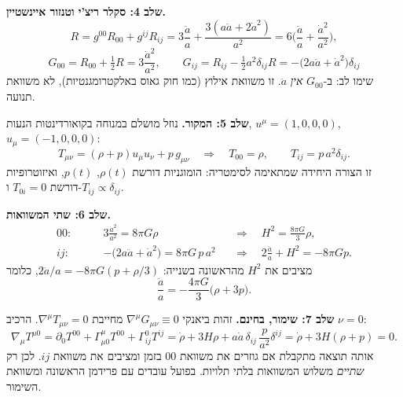 \textbf{שלב 4: סקלר ריצ'י וטנזור איינשטיין.}
\begin{equation}
R=g^{00}R_{00}+g^{ij}R_{ij}=3\frac{\ddot a}{a}+\frac{3(a\ddot a+2\dot a^2)}{a^2}=6\Big(\frac{\ddot a}{a}+\frac{\dot a^2}{a^2}\Big),
\end{equation}
\begin{equation}
\boxed{\;G_{00}=R_{00}+\tfrac12R=3\frac{\dot a^2}{a^2},\qquad
G_{ij}=R_{ij}-\tfrac12a^2\delta_{ij}R=-\big(2a\ddot a+\dot a^2\big)\delta_{ij}\;}
\end{equation}
שימו לב: ב-$G_{00}$ \emph{אין} $\ddot a$. זו משוואת אילוץ (כמו חוק גאוס באלקטרומגנטיות), לא משוואת תנועה.

\textbf{שלב 5: המקור.} נוזל מושלם במנוחה בקואורדינטות הנעות, $u^\mu=(1,0,0,0)$, $u_\mu=(-1,0,0,0)$:
\begin{equation}
T_{\mu\nu}=(\rho+p)u_\mu u_\nu+p\,g_{\mu\nu}\quad\Longrightarrow\quad T_{00}=\rho,\qquad T_{ij}=p\,a^2\delta_{ij}.
\end{equation}
זו הצורה היחידה שמתאימה לסימטריה: הומוגניות דורשת $\rho(t)$, $p(t)$, ואיזוטרופיות דורשת $T_{0i}=0$ ו-$T_{ij}\propto\delta_{ij}$.

\textbf{שלב 6: שתי המשוואות.}
\begin{align}
00:\qquad &3\frac{\dot a^2}{a^2}=8\pi G\rho &&\Longrightarrow\quad H^2=\frac{8\pi G}{3}\rho ,\\
ij:\qquad &-\big(2a\ddot a+\dot a^2\big)=8\pi G\,p\,a^2 &&\Longrightarrow\quad 2\frac{\ddot a}{a}+H^2=-8\pi Gp .
\end{align}
מציבים את $H^2$ מהראשונה בשנייה: $2\ddot a/a=-8\pi G(p+\rho/3)$, כלומר
\begin{equation}
\frac{\ddot a}{a}=-\frac{4\pi G}{3}\big(\rho+3p\big).
\end{equation}

\textbf{שלב 7: שימור, בחינם.} זהות ביאנקי $\nabla^\mu G_{\mu\nu}\equiv0$ מחייבת $\nabla^\mu T_{\mu\nu}=0$. הרכיב $\nu=0$:
\begin{equation}
\nabla_\mu T^{\mu0}=\partial_0T^{00}+\Gamma^\mu_{\mu0}T^{00}+\Gamma^0_{ij}T^{ij}
=\dot\rho+3H\rho+a\dot a\,\delta_{ij}\,\frac{p}{a^2}\delta^{ij}
=\dot\rho+3H(\rho+p)=0 .
\end{equation}
אותה תוצאה מתקבלת אם גוזרים את משוואת $00$ בזמן ומציבים את משוואת $ij$. לכן רק \emph{שתיים} משלוש המשוואות בלתי תלויות. בפועל עובדים עם פרידמן הראשונה ומשוואת השימור.

